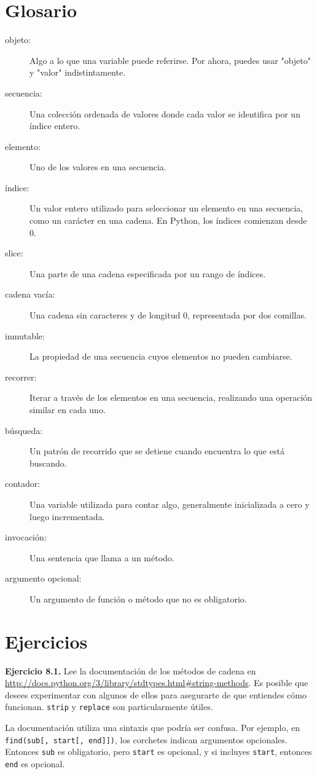 \section{Glosario}

\begin{description}
\item[objeto:] Algo a lo que una variable puede referirse. Por ahora, puedes usar "objeto" y "valor" indistintamente.
\item[secuencia:] Una colección ordenada de valores donde cada valor se identifica por un índice entero.
\item[elemento:] Uno de los valores en una secuencia.
\item[índice:] Un valor entero utilizado para seleccionar un elemento en una secuencia, como un carácter en una cadena. En Python, los índices comienzan desde 0.
\item[slice:] Una parte de una cadena especificada por un rango de índices.
\item[cadena vacía:] Una cadena sin caracteres y de longitud 0, representada por dos comillas.
\item[inmutable:] La propiedad de una secuencia cuyos elementos no pueden cambiarse.
\item[recorrer:] Iterar a través de los elementos en una secuencia, realizando una operación similar en cada uno.
\item[búsqueda:] Un patrón de recorrido que se detiene cuando encuentra lo que está buscando.
\item[contador:] Una variable utilizada para contar algo, generalmente inicializada a cero y luego incrementada.
\item[invocación:] Una sentencia que llama a un método.
\item[argumento opcional:] Un argumento de función o método que no es obligatorio.
\end{description}

\section{Ejercicios}

\textbf{Ejercicio 8.1.} Lee la documentación de los métodos de cadena en \url{http://docs.python.org/3/library/stdtypes.html#string-methods}. Es posible que desees experimentar con algunos de ellos para asegurarte de que entiendes cómo funcionan. \texttt{strip} y \texttt{replace} son particularmente útiles.

La documentación utiliza una sintaxis que podría ser confusa. Por ejemplo, en \texttt{find(sub[, start[, end]])}, los corchetes indican argumentos opcionales. Entonces \texttt{sub} es obligatorio, pero \texttt{start} es opcional, y si incluyes \texttt{start}, entonces \texttt{end} es opcional.

